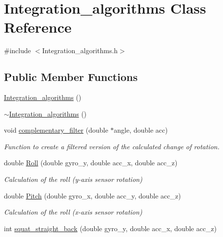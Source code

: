 \hypertarget{class_integration__algorithms}{}\section{Integration\+\_\+algorithms Class Reference}
\label{class_integration__algorithms}


{\ttfamily \#include $<$Integration\+\_\+algorithms.\+h$>$}

\subsection*{Public Member Functions}
\begin{DoxyCompactItemize}
\item 
\mbox{\hyperlink{class_integration__algorithms_adc24b9c4f28db0e56755297e0f3eaa27}{Integration\+\_\+algorithms}} ()
\item 
\mbox{\hyperlink{class_integration__algorithms_a2ef259e2e7da2b39e374e03a1fc748ec}{$\sim$\+Integration\+\_\+algorithms}} ()
\item 
void \mbox{\hyperlink{class_integration__algorithms_a0966fe666b2c99a384c7a138a6817ece}{complementary\+\_\+filter}} (double $\ast$angle, double acc)
\begin{DoxyCompactList}\small\item\em Function to create a filtered version of the calculated change of rotation. \end{DoxyCompactList}\item 
double \mbox{\hyperlink{class_integration__algorithms_a5edf31b0eb679866bc9426dcae975df5}{Roll}} (double gyro\+\_\+y, double acc\+\_\+x, double acc\+\_\+z)
\begin{DoxyCompactList}\small\item\em Calculation of the roll (y-\/axis sensor rotation) \end{DoxyCompactList}\item 
double \mbox{\hyperlink{class_integration__algorithms_aa501e38449c081dd1ece866f5e9a4150}{Pitch}} (double gyro\+\_\+x, double acc\+\_\+y, double acc\+\_\+z)
\begin{DoxyCompactList}\small\item\em Calculation of the roll (x-\/axis sensor rotation) \end{DoxyCompactList}\item 
int \mbox{\hyperlink{class_integration__algorithms_a1e3abc78c151732e013b41fa0300a6f0}{squat\+\_\+straight\+\_\+back}} (double gyro\+\_\+y, double acc\+\_\+x, double acc\+\_\+z)

\end{DoxyCompactItemize}
